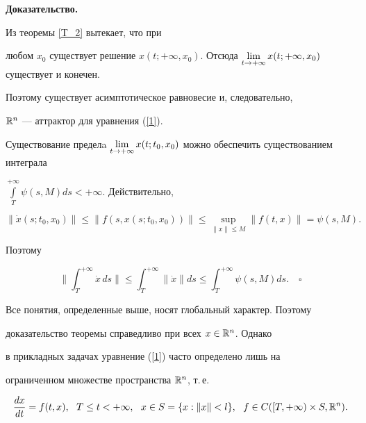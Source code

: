 {\bf Доказательство.}


Из теоремы \ref{T_2} вытекает, что при


любом $x_{0}$ существует решение $x(t;+\infty,x_{0})$. Отсюда $\lim


\limits_{t \rar +\infty}x(t;+\infty,x_{0})$ существует и конечен.


Поэтому существует асимптотическое равновесие и, следовательно,


${\Bbb R}^{n}$ --- аттрактор для уравнения (\ref{1}).





Существование пределa $\lim \limits_{t\rar


+\infty}x(t;t_{0},x_{0})$ можно обеспечить существованием интеграла\linebreak


$\int\limits_{T}^{+\infty}\psi(s,M)ds<+\infty$. Действительно,


$$


\|\Dot x(s;t_{0},x_{0})\| \leq


\|f(s,x(s;t_{0},x_{0}))\| \leq \sup\limits_{\|x\| \leq


M}\|f(t,x)\| = \psi(s,M).


$$


Поэтому


$$


\bigg\|\int_{T}^{+\infty}\Dot x\,ds\bigg\| \leq


\int_{T}^{+\infty} \|\Dot x\|ds \leq


\int_{T}^{+\infty} \psi(s,M)ds.\quad\square


$$





Все понятия, определенные выше, носят глобальный характер. Поэтому


доказательство теоремы справедливо при всех $x \in {\Bbb R}^{n}$. Однако


в прикладных задачах уравнение (\ref{1}) часто определено лишь на


ограниченном множестве пространства ${\Bbb R}^{n}$, т.\,е.


\begin{equation}


\label{2}


\frac{dx}{dt}=f(t,x),\ \


T\leq t<+\infty, \ \ x\in S=\lbrace x:\|x\|<l


\rbrace,\ \ f \in C([T,+\infty) \times S,\R^{n}).


\end{equation}





